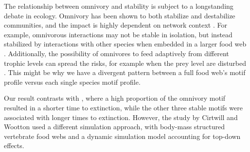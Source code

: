 \documentclass[12pt]{article}
\begin{document}
\begin{spacing}{2.0}
The relationship between omnivory and stability is subject to a longstanding debate in ecology. Omnivory has been shown to both stabilize and destabilize communities, and the impact is highly dependent on network context \citep{bascompte2005simple, MonteiroFaria2016, Kratinaetal2012}. 
For example, omnivorous interactions may not be stable in isolation, but instead stabilized by interactions with other species when embedded in a larger food web \citep{Kratinaetal2012}. Additionally, the possibility of omnivores to feed adaptively from different trophic levels can spread the risks, for example when the prey level are disturbed \citep{Fagan1997}.
This might be why we have a divergent pattern between a full food web's motif profile versus each single species motif profile.

Our result contrasts with \citep{Cirtwill2021_inprep}, where a high proportion of the omnivory motif resulted in a shorter time to extinction, while the other three stable motifs were associated with longer times to extinction. However, the study by Cirtwill and Wootton used a different simulation approach, with body-mass structured vertebrate food webs and a dynamic simulation model accounting for top-down effects. 
     
    

\end{spacing}
\end{document}
